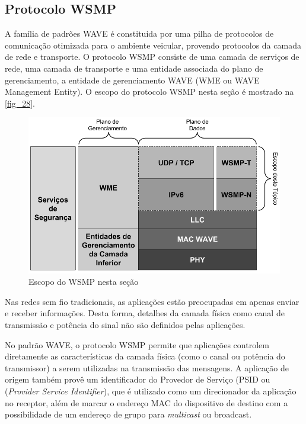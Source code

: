 \documentclass[
12pt,				%
openright,			%
oneside,			%
a4paper,			%
brazil,				%
]{abntex2}
\begin{document}
	\subsection{Protocolo WSMP}
	
	\par A família de padrões WAVE é constituida por uma pilha de protocolos de comunicação otimizada para o ambiente veicular, provendo protocolos da camada de rede e transporte. O protocolo WSMP consiste de uma camada de serviços de rede, uma camada de transporte e uma entidade associada do plano de gerenciamento, a entidade de gerenciamento WAVE (WME ou WAVE Management Entity). O escopo do protocolo WSMP nesta seção é mostrado na \autoref{fig_28}.
	
	\begin{figure} [H]
		\centering
		\includegraphics[scale=.45]{figuras/cap3/28Escopo}
		\caption{\label{fig_28}Escopo do WSMP nesta seção}
	\end{figure}
	
	\par Nas redes sem fio tradicionais, as aplicações estão preocupadas em apenas enviar e receber informações. Desta forma, detalhes da camada física como canal de transmissão e potência do sinal não são definidos pelas aplicações.
	
	\par No padrão WAVE, o protocolo WSMP permite que aplicações controlem diretamente as características da camada física (como o canal ou potência do transmissor) a serem utilizadas na transmissão das mensagens. A aplicação de origem também provê um identificador do Provedor de Serviço (PSID ou (\textit{Provider Service Identifier}), que é utilizado como um direcionador da  aplicação no receptor, além de marcar o endereço MAC do dispositivo de destino com a possibilidade de um endereço de grupo para \textit{multicast} ou broadcast.
	
\end{document}

